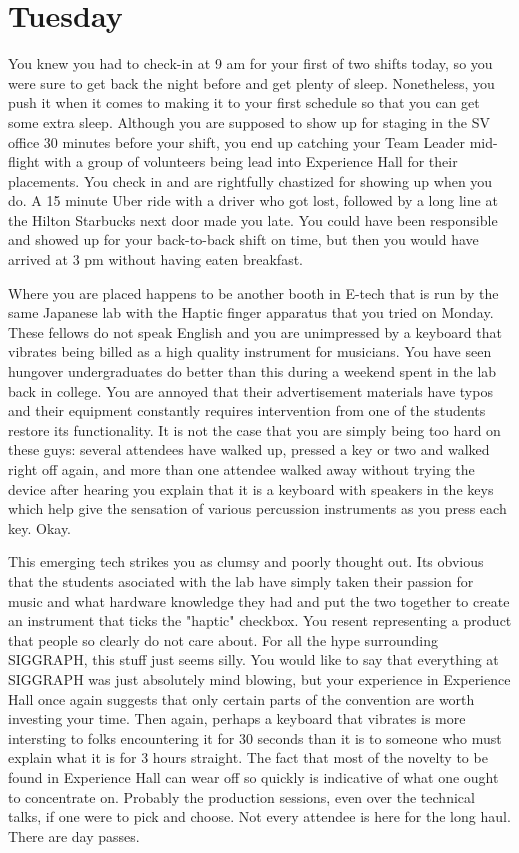 \documentclass[../main.tex]{subfiles}
\begin{document}
\section{Tuesday}

You knew you had to check-in at 9 am for your first of two shifts today, so you were sure to get back the night before and get plenty of sleep. Nonetheless, you push it when it comes to making it to your first schedule so that you can get some extra sleep. Although you are supposed to show up for staging in the SV office 30 minutes before your shift, you end up catching your Team Leader mid-flight with a group of volunteers being lead into Experience Hall for their placements. You check in and are rightfully chastized for showing up when you do. A 15 minute Uber ride with a driver who got lost, followed by a long line at the Hilton Starbucks next door made you late. You could have been responsible and showed up for your back-to-back shift on time, but then you would have arrived at 3 pm without having eaten breakfast.

Where you are placed happens to be another booth in E-tech that is run by the same Japanese lab with the Haptic finger apparatus that you tried on Monday. These fellows do not speak English and you are unimpressed by a keyboard that vibrates being billed as a high quality instrument for musicians. You have seen hungover undergraduates do better than this during a weekend spent in the lab back in college. You are annoyed that their advertisement materials have typos and their equipment constantly requires intervention from one of the students restore its functionality. It is not the case that you are simply being too hard on these guys: several attendees have walked up, pressed a key or two and walked right off again, and more than one attendee walked away without trying the device after hearing you explain that it is a keyboard with speakers in the keys which help give the sensation of various percussion instruments as you press each key. Okay.

This emerging tech strikes you as clumsy and poorly thought out. Its obvious that the students asociated with the lab have simply taken their passion for music and what hardware knowledge they had and put the two together to create an instrument that ticks the "haptic" checkbox. You resent representing a product that people so clearly do not care about. For all the hype surrounding SIGGRAPH, this stuff just seems silly. You would like to say that everything at SIGGRAPH was just absolutely mind blowing, but your experience in Experience Hall once again suggests that only certain parts of the convention are worth investing your time. Then again, perhaps a keyboard that vibrates is more intersting to folks encountering it for 30 seconds than it is to someone who must explain what it is for 3 hours straight. The fact that most of the novelty to be found in Experience Hall can wear off so quickly is indicative of what one ought to concentrate on. Probably the production sessions, even over the technical talks, if one were to pick and choose. Not every attendee is here for the long haul. There are day passes.
\end{document}
